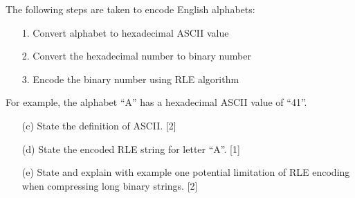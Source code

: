 The following steps are taken to encode English alphabets:
\begin{enumerate}
\item[1.]  Convert alphabet to hexadecimal ASCII value 
\item[2.]  Convert the hexadecimal number to binary number 
\item[3.]  Encode the binary number using RLE algorithm
\end{enumerate}
For example, the alphabet \textquotedblleft A\textquotedblright{}
has a hexadecimal ASCII value of \textquotedblleft 41\textquotedblright .
\begin{enumerate}
\item[(c)]  State the definition of ASCII.\hfill{} {[}2{]}
\item[(d)]  State the encoded RLE string for letter \textquotedblleft A\textquotedblright .\hfill{}
{[}1{]}
\item[(e)]  State and explain with example one potential limitation of RLE encoding
when compressing long binary strings. \hfill{}{[}2{]}
\end{enumerate}